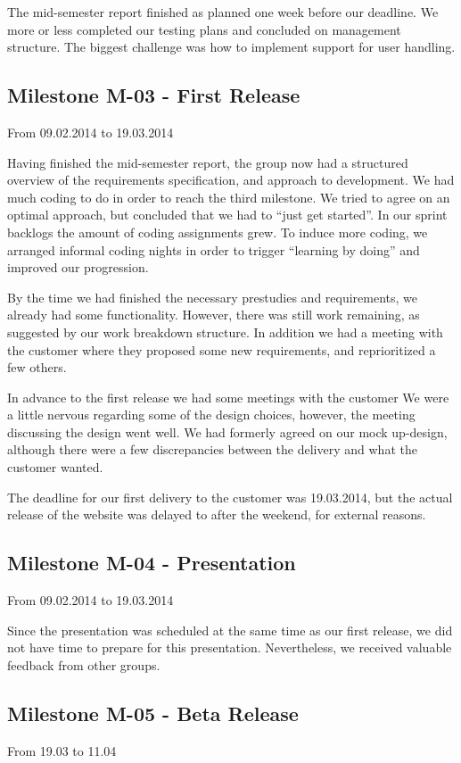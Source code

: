 The mid-semester report finished as planned one week before our deadline. We
more or less completed our testing plans and concluded on management structure.
The biggest challenge was how to implement support for user handling. 

\subsection{Milestone M-03 - First Release}
\label{sec:M03}
From 09.02.2014 to 19.03.2014

Having finished the mid-semester report, the group now had a structured
overview of the requirements specification, and approach to development. We had
much coding to do in order to reach the third milestone. We tried to agree on
an optimal approach, but concluded that we had to ``just get started''. In our
sprint backlogs the amount of coding assignments grew. To induce more coding,
we arranged informal coding nights in order to trigger ``learning by doing''
and improved our progression.

By the time we had finished the necessary prestudies and requirements, we
already had some functionality. However, there was still work remaining, as
suggested by our work breakdown structure. In addition we had a meeting with
the customer where they proposed some new requirements, and reprioritized a few
others. 

In advance to the first release we had some meetings with the customer We
were a little nervous regarding some of the design choices, however, the
meeting discussing the design went well. We had formerly agreed on our mock
up-design, although there were a few discrepancies between the delivery and
what the customer wanted.

The deadline for our first delivery to the customer was 19.03.2014, but the
actual release of the website was delayed to after the weekend, for external
reasons. 

\pagebreak
\subsection{Milestone M-04 - Presentation}
\label{sec:M04}
From 09.02.2014 to 19.03.2014

Since the presentation was scheduled at the same time as our first
release, we did not have time to prepare for this presentation.
Nevertheless, we received valuable feedback from other groups.

\subsection{Milestone M-05 - Beta Release}
\label{sec:M05}
From 19.03 to 11.04

